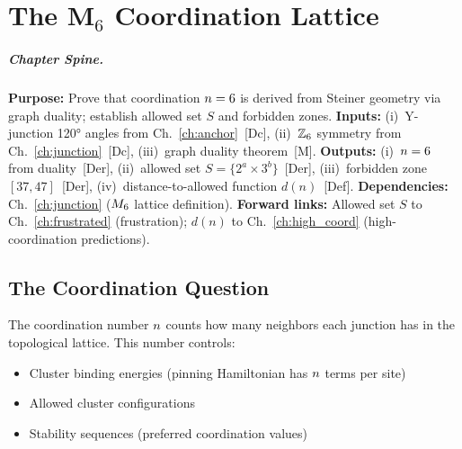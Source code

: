 
\chapter{The M$_6$ Coordination Lattice}
\label{ch:M6}


\begin{abstract}
Why is the coordination number $\ncoord = 6$ in the topological lattice? This chapter
proves that $\ncoord = 6$ is a \emph{derived} consequence of Steiner Y-junction geometry
and graph duality, not an arbitrary choice. We then establish the allowed set
$S = \{2^a \times 3^b\}$ and the forbidden zone $[37, 47]$.
\end{abstract}

\paragraph{Chapter Spine.}
\textbf{Purpose:} Prove that coordination $\ncoord = 6$ is derived from Steiner
geometry via graph duality; establish allowed set $S$ and forbidden zones.
\textbf{Inputs:} (i)~Y-junction 120° angles from Ch.~\ref{ch:anchor}~[Dc],
(ii)~$\mathbb{Z}_6$ symmetry from Ch.~\ref{ch:junction}~[Dc], (iii)~graph duality theorem~[M].
\textbf{Outputs:} (i)~$\ncoord = 6$ from duality~[Der], (ii)~allowed set
$S = \{2^a \times 3^b\}$~[Der], (iii)~forbidden zone $[37, 47]$~[Der],
(iv)~distance-to-allowed function $d(n)$~[Def].
\textbf{Dependencies:} Ch.~\ref{ch:junction} ($M_6$ lattice definition).
\textbf{Forward links:} Allowed set $S$ to Ch.~\ref{ch:frustrated} (frustration);
$d(n)$ to Ch.~\ref{ch:high_coord} (high-coordination predictions).

\section{The Coordination Question}
\label{sec:M6:question}

The coordination number $n$ counts how many neighbors each junction has in the
topological lattice. This number controls:
\begin{itemize}
    \item Cluster binding energies (pinning Hamiltonian has $n$ terms per site)
    \item Allowed cluster configurations
    \item Stability sequences (preferred coordination values)
\end{itemize}

